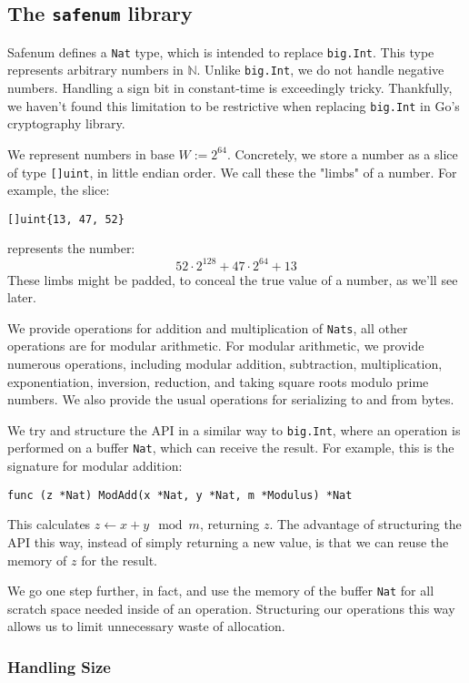 \documentclass[11pt, a4paper]{article} %
\begin{document}
{\subsection{The \texttt{safenum} library}

Safenum defines a \texttt{Nat} type, which is intended to
replace \texttt{big.Int}. This type represents arbitrary
numbers in $\mathbb{N}$. Unlike \texttt{big.Int}, we do not handle
negative numbers. Handling a sign bit in constant-time is exceedingly
tricky. Thankfully, we haven't found this limitation to be restrictive
when replacing \texttt{big.Int} in Go's cryptography library.

We represent numbers in base $W := 2^{64}$. Concretely, we
store a number as a slice of type \texttt{[]uint}, in little
endian order. We call these the "limbs" of a number. For example,
the slice:
\begin{verbatim}
[]uint{13, 47, 52}
\end{verbatim}
represents the number:
$$
52 \cdot 2^{128} + 47 \cdot 2^{64} + 13
$$
These limbs might be padded, to conceal the true value of a number,
as we'll see later.

We provide operations for addition and multiplication of \texttt{Nats},
all other operations are for modular arithmetic. For modular arithmetic,
we provide numerous operations, including modular addition, subtraction,
multiplication, exponentiation, inversion, reduction, and taking
square roots modulo prime numbers. We also provide the usual operations
for serializing to and from bytes.

We try and structure the API in a similar way to \texttt{big.Int},
where an operation is performed on a buffer \texttt{Nat}, which
can receive the result. For example, this is the signature for
modular addition:

\begin{verbatim}
func (z *Nat) ModAdd(x *Nat, y *Nat, m *Modulus) *Nat
\end{verbatim}

This calculates $z \leftarrow x + y \mod m$, returning $z$. The advantage
of structuring the API this way, instead of simply returning a new
value, is that we can reuse the memory of $z$ for the result.

We go one step further, in fact, and use the memory of the buffer
\texttt{Nat} for all scratch space needed inside of an operation.
Structuring our operations this way allows us to limit unnecessary waste
of allocation.

\subsubsection{Handling Size}

}
\end{document}
